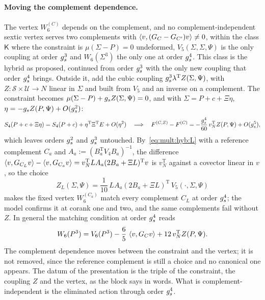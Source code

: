 \paragraph{Moving the complement dependence.}
The vertex $W_6^{(C)}$ depends on the complement, and no complement-independent sextic vertex serves two complements with $\braket{v, (G_C - G_{C'}) v} \neq 0$, within the class $\mathsf K$ where the constraint is $\mu (\Sigma - P) = 0$ undeformed, $V_5(\Sigma, \Sigma, \Psi)$ is the only coupling at order $g_s^3$ and $W_6(\Sigma^3)$ the only one at order $g_s^4$.
This class is the hybrid as proposed, continued from order $g_s^3$ with the only new coupling that order $g_s^4$ brings.
Outside it, add the cubic coupling $g_s^3 \lambda^{\mathrm{T}} Z(\Sigma, \Psi)$, with $Z \colon \mathcal S \times \mathcal U \to N$ linear in $\Sigma$ and built from $V_5$ and an inverse on a complement.
The constraint becomes $\mu (\Sigma - P) + g_s Z(\Sigma, \Psi) = 0$, and with $\Sigma = P + c + \Xi \eta$, $\eta = - g_s Z(P, \Psi) + O(g_s^2)$:
\begin{equation}
  S_4(P + c + \Xi \eta)
    = S_4(P + c) + \eta^{\mathrm{T}} \Xi^{\mathrm{T}} E + O(\eta^2)
  \quad \Longrightarrow \quad
  F^{(C, Z)} - F^{(C)}
    = - \frac{g_s^4}{60} \, v_N^{\mathrm{T}} Z(P, \Psi) + O(g_s^5),
\end{equation}
which leaves orders $g_s^2$ and $g_s^3$ untouched.
By~\eqref{eq:mult:hyb:L} with a reference complement $C_a$ and $A_a := (B_a^{\mathrm{T}} V_4 B_a)^{-1}$, the difference $\braket{v, G_{C_L} v} - \braket{v, G_{C_a} v} = v_N^{\mathrm{T}} L A_a (2 B_a + \Xi L)^{\mathrm{T}} v$ is $v_N^{\mathrm{T}}$ against a covector linear in $v$, so the choice
\begin{equation}
  Z_L(\Sigma, \Psi)
    = \frac{1}{10} \, L A_a (2 B_a + \Xi L)^{\mathrm{T}} \, V_5(\cdot, \Sigma, \Psi)
\end{equation}
makes the fixed vertex $W_6^{(C_a)}$ match every complement $C_L$ at order $g_s^4$; the model confirms it at corank one and two, and the same complements fail without $Z$.
In general the matching condition at order $g_s^4$ reads
\begin{equation}
  W_6(P^3)
    = V_6(P^3)
      - \frac{6}{5} \, \braket{v, G_C v}
      + 12 \, v_N^{\mathrm{T}} Z(P, \Psi).
\end{equation}
The complement dependence moves between the constraint and the vertex; it is not removed, since the reference complement is still a choice and no canonical one appears.
The datum of the presentation is the triple of the constraint, the coupling $Z$ and the vertex, as the block says in words.
What is complement-independent is the eliminated action through order $g_s^4$.

